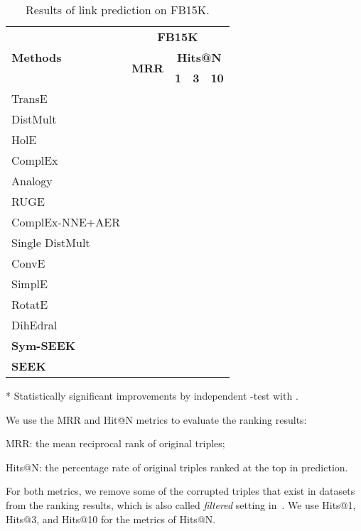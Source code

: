 \documentclass[11pt,a4paper]{article}
\newcommand{\TableSize}{\footnotesize} \renewcommand{\thefootnote}{\fnsymbol{footnote}}
\begin{document}
\begin{table}[!h]
	\centering
	\begin{threeparttable}
		
		\TableSize
		\begin{tabular}{ l | c  c  c  c}
			\toprule
			\multirow{3}{*}{\textbf{Methods }}  &  \multicolumn{4}{c}{\textbf{FB15K}} \\
			\cmidrule{2-5}	
			& \multirow{2}{*}{\textbf{MRR}}  &  \multicolumn{3}{c}{\textbf{Hits@N}} \\ 
			\cmidrule{3-5}	
			& & \textbf{1} & \textbf{3} & \textbf{10}  \\ 
			\midrule
			TransE&  &  &  &  \\
			DistMult&  &  &  &  \\
			HolE &  &  &  &  \\
			ComplEx&  &  &  &  \\		
			Analogy&  &  &  &  \\
			\midrule
			RUGE&  &  &  &  \\
			ComplEx-NNE+AER &  &  &  & \\
			\midrule
			Single DistMult &  & && \\	
			ConvE&  &  &  &  \\
SimplE&  &  &  &   \\
RotatE&  &  &  &  \\ 
			DihEdral &  &  &  &  \\
			\midrule
			\textbf{Sym-SEEK}\tnote{*} &  &   &  &  \\
			\textbf{SEEK}\tnote{*} &  &   &  &  \\
			\bottomrule
		\end{tabular}
		
		\begin{tablenotes}
			\item[*] Statistically significant improvements by independent -test with .
		\end{tablenotes}
		
	\end{threeparttable}
	\caption{Results of link prediction on FB15K.}	
	\label{tab:kbc-performance-fb15k}
\end{table}

We use the MRR and Hit@N metrics to evaluate the ranking results:
\begin{enumerate*}[label={\alph*)}]
	\item MRR: the mean reciprocal rank of original triples;
	\item Hits@N: the percentage rate of original triples ranked at the top  in prediction.
\end{enumerate*}
For both metrics, we remove some of the corrupted triples that exist in datasets from the ranking results, which is also called \emph{filtered} setting in~\cite{bordes2013translating}. We use Hits@1, Hits@3, and Hits@10 for the metrics of Hits@N.
\end{document}
